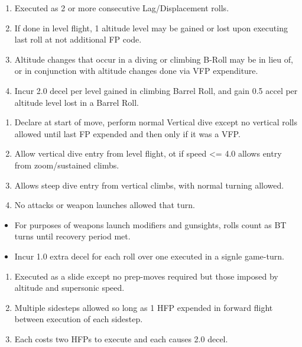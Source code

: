 \begin{table*}
\begin{multicols}{2}

\begin{enumerate}[nosep]
    \item Executed as 2 or more consecutive Lag/Displacement rolls.
    \item If done in level flight, 1 altitude level may be gained or lost upon executing last roll at not additional FP code.
    \item Altitude changes that occur in a diving or climbing B-Roll may be in lieu of, or in conjunction with altitude changes done via VFP expenditure.
    \item Incur 2.0 decel per level gained in climbing Barrel Roll, and gain 0.5 accel per altitude level lost in a Barrel Roll.
\end{enumerate}


\begin{enumerate}[nosep]
    \item Declare at start of move, perform normal Vertical dive except no vertical rolls allowed until last FP expended and then only if it was a VFP.
    \item Allow vertical dive entry from level flight, ot if speed <= 4.0 allows entry from zoom/sustained climbs.
    \item Allows steep dive entry from vertical climbs, with normal turning allowed.
    \item No attacks or weapon launches allowed that turn.
\end{enumerate}

\begin{itemize}[nosep]
    \item For purposes of weapons launch modifiers and gunsights, rolls count as BT turns until recovery period met.
    \item Incur 1.0 extra decel for each roll over one executed in a signle game-turn.
\end{itemize}



\begin{enumerate}[nosep]
    \item Executed as a slide except no prep-moves required but those imposed by altitude and supersonic speed.
    \item Multiple sidesteps allowed so long as 1 HFP expended in forward flight between execution of each sidestep.
    \item Each costs two HFPs to execute and each causes 2.0 decel.
\end{enumerate}


\end{multicols}
\end{table*}
